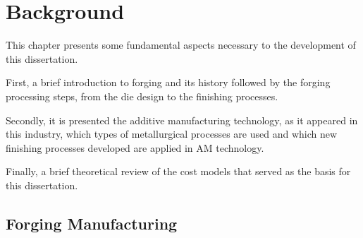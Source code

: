 
\chapter{Background}
\label{chapter:background}

This chapter presents some fundamental aspects necessary to the development of this dissertation.\par
First, a brief introduction to forging and its history followed by the forging processing steps, from the die design to the finishing processes.\par
Secondly, it is presented the additive manufacturing technology, as it appeared in this industry, which types of metallurgical processes are used and which new finishing processes developed are applied in \ac{AM} technology.\par
Finally, a brief theoretical review of the cost models that served as the basis for this dissertation.

\section{Forging Manufacturing}
